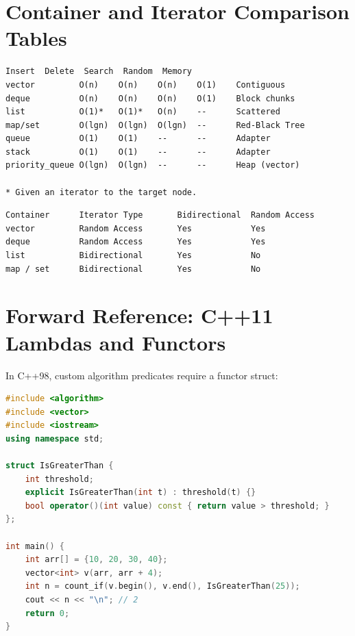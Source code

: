 \section{Container and Iterator Comparison Tables}
\label{sec:comparison-tables}

\begin{lstlisting}[language={}, caption={Container complexity at a glance}]
               Insert  Delete  Search  Random  Memory
vector         O(n)    O(n)    O(n)    O(1)    Contiguous
deque          O(n)    O(n)    O(n)    O(1)    Block chunks
list           O(1)*   O(1)*   O(n)    --      Scattered
map/set        O(lgn)  O(lgn)  O(lgn)  --      Red-Black Tree
queue          O(1)    O(1)    --      --      Adapter
stack          O(1)    O(1)    --      --      Adapter
priority_queue O(lgn)  O(lgn)  --      --      Heap (vector)

* Given an iterator to the target node.
\end{lstlisting}

\begin{lstlisting}[language={}, caption={Iterator category by container}]
Container      Iterator Type       Bidirectional  Random Access
vector         Random Access       Yes            Yes
deque          Random Access       Yes            Yes
list           Bidirectional       Yes            No
map / set      Bidirectional       Yes            No
\end{lstlisting}

\section{Forward Reference: C++11 Lambdas and Functors}
\label{sec:lambda-forward-ref}

In C++98, custom algorithm predicates require a functor struct:

\begin{lstlisting}[language=C++, caption={C++98 functor --- verbose but correct}]
#include <algorithm>
#include <vector>
#include <iostream>
using namespace std;

struct IsGreaterThan {
    int threshold;
    explicit IsGreaterThan(int t) : threshold(t) {}
    bool operator()(int value) const { return value > threshold; }
};

int main() {
    int arr[] = {10, 20, 30, 40};
    vector<int> v(arr, arr + 4);
    int n = count_if(v.begin(), v.end(), IsGreaterThan(25));
    cout << n << "\n"; // 2
    return 0;
}
\end{lstlisting}

